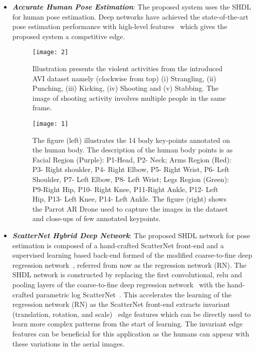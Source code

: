 \documentclass[10pt,twocolumn,letterpaper]{article}
\begin{document}
\begin{itemize}
	\setlength\itemsep{-0.35em}
\item \textbf{\textit{Accurate Human Pose Estimation}}: The proposed system uses the SHDL for human pose estimation. Deep networks have achieved the state-of-the-art pose estimation performance with high-level features~\cite{li20143d, pfister2014deep, toshev2014deeppose} which gives the proposed system a competitive edge.

\begin{figure}[t]
	\begin{center}
		\texttt{[image: 2]}
	\end{center}
	\caption{\small{Illustration presents the violent activities from the introduced AVI dataset namely (clockwise from top) (i) Strangling,
			(ii) Punching, (iii) Kicking, (iv) Shooting and (v) Stabbing. The image of shooting activity involves multiple people in the same frame.}}
	\label{fig:long}
	\label{fig:onecol}
\end{figure}

\begin{figure}[t]
	\begin{center}
		\texttt{[image: 1]}
	\end{center}
	\caption{\small{The figure (left) illustrates the 14 body key-points annotated on the human body. The description of the human body points is as Facial Region (Purple): P1-Head, P2- Neck; Arms Region (Red): P3- Right shoulder, P4- Right Elbow, P5- Right Wrist, P6- Left Shoulder, P7- Left Elbow, P8- Left Wrist; Legs Region (Green): P9-Right Hip, P10- Right Knee, P11-Right Ankle, P12- Left Hip, P13- Left Knee, P14- Left Ankle. The figure (right) shows the Parrot AR Drone used to capture the images in the dataset and close-ups of few annotated keypoints.}}
	\label{fig:long}
	\label{fig:onecol}
\end{figure}

\item \textbf{\textit{ScatterNet Hybrid Deep Network}}: The proposed SHDL network for pose estimation is composed of a hand-crafted ScatterNet front-end and a supervised learning based back-end formed of the modified coarse-to-fine deep regression network~\cite{belagiannis2015robust}, referred from now as the regression network (RN). The SHDL network is constructed by replacing the first convolutional, relu and pooling layers of the coarse-to-fine deep regression network~\cite{belagiannis2015robust} with the hand-crafted parametric log ScatterNet~\cite{singh}. This accelerates the learning of the regression network (RN) as the ScatterNet front-end extracts invariant (translation, rotation, and scale)~\cite{sifre2013} edge features which can be directly used to learn more complex patterns from the start of learning.  The invariant edge features can be beneficial for this application as the humans can appear with these variations in the aerial images. 


\end{itemize}
\end{document}
